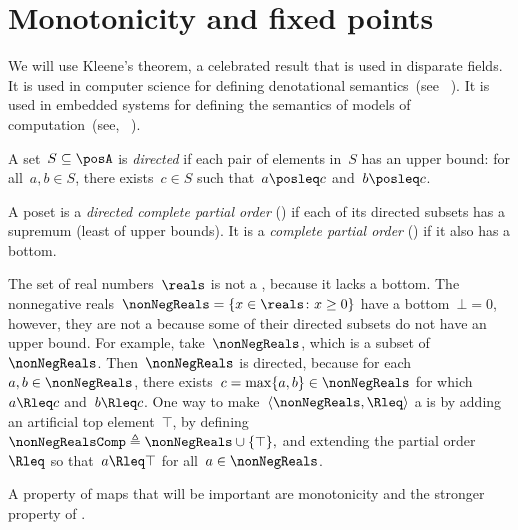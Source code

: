 

\section{Monotonicity and fixed points}
\label{sec:Monotonicity-and-fixed}

We will use Kleene's theorem, a celebrated result that is used in
disparate fields. It is used in computer science for defining denotational
semantics~(see \eg~\cite{manes86}). It is used in embedded systems
for defining the semantics of models of computation~(see, \eg~\cite{lee10}).

\begin{definition}
  \label{def:directed-set}
  A set~$S\subseteq\posA$ is \emph{directed} if each pair of elements
  in~$S$ has an upper bound: for all~$a,b\in S$, there exists~$c\in S$
  such that~$a\posleq c$ and~$b\posleq c$.
\end{definition}

\begin{definition}[Completeness]
  \label{def:cpo}A poset is a \emph{directed complete partial order}
  (\DCPO) if each of its directed subsets has a supremum (least of
  upper bounds). It is a \emph{complete partial order} (\CPO) if it
  also has a bottom.

\end{definition}
\begin{example}
  \label{exa:Rcomp}The set of real numbers~$\reals$ is not
  a \CPO, because it lacks a bottom. The nonnegative reals~$\nonNegReals=\{x\in\reals \colon x\geq0\}$
  have a bottom~$\bot=0$, however, they are not a \DCPO because some
  of their directed subsets do not have an upper bound. For example,
  take~$\nonNegReals$, which is a subset of~$\nonNegReals$. Then~$\nonNegReals$
  is directed, because for each~$a,b\in\nonNegReals$, there exists~$c=\max\{a,b\}\in\nonNegReals$
  for which~$a\Rleq c$ and~$b\Rleq c$. One way to make~$\left\langle \nonNegReals,\Rleq\right\rangle $
  a \CPO is by adding an artificial top element~$\top$, by defining~$\nonNegRealsComp\triangleq\nonNegReals\cup\{\top\},$
  and extending the partial order~$\Rleq$ so that~$a\Rleq\top$ for
  all~$a\in\nonNegReals$.
\end{example}

A property of maps that will be important are monotonicity and
the stronger property of \scottcontinuity.


